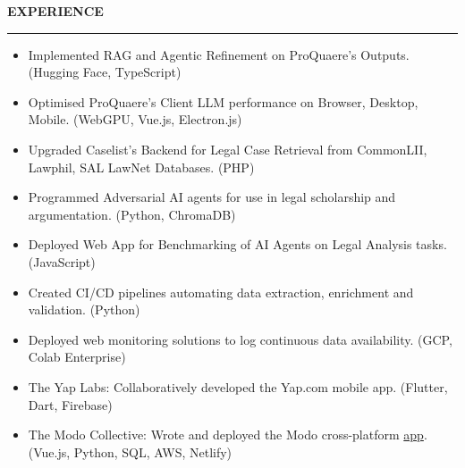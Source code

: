 \documentclass[11pt, letterpaper]{article}
\newcommand\sectionTitle[1]{%
    \begingroup
        \textbf{\MakeUppercase{#1}}
        \vspace{0.4em}
        \hrule
        \vspace{-0.3em}
    \endgroup
}%
\newenvironment{experienceSection}[1]{%
    \sectionTitle{#1}%
    \begin{list}{}{ %
        \setlength{\leftmargin}{0em} %
    }%
        \item[]%
    }{%
    \end{list}%
}%
\begin{document}
\begin{experienceSection}{Experience}

    \experienceItem[
        company={Custom Automated Systems},
        location={Singapore},
        position={Full Stack Development Intern},
        duration={May 2025 - Aug. 2025}
    ]
    \begin{itemize}
        \setlength{\itemsep}{-6pt}
        \item Implemented RAG and Agentic Refinement on ProQuaere's Outputs. (Hugging Face, TypeScript)
        \item Optimised ProQuaere's Client LLM performance on Browser, Desktop, Mobile. (WebGPU, Vue.js, Electron.js)
        \item Upgraded Caselist's Backend for Legal Case Retrieval from CommonLII, Lawphil, SAL LawNet Databases. (PHP)
    \end{itemize}

    \experienceItem[
        company={SMU Yong Pung How School of Law},
        location={Singapore},
        position={Research Assistant},
        duration={Jan. 2025 - Aug. 2025}
    ]
    \begin{itemize}
        \setlength{\itemsep}{-6pt}
        \item Programmed Adversarial AI agents for use in legal scholarship and argumentation. (Python, ChromaDB)
        \item Deployed Web App for Benchmarking of AI Agents on Legal Analysis tasks. (JavaScript)
    \end{itemize}

    \experienceItem[
        company={Elefant},
        location={Singapore},
        position={Backend Development Intern},
        duration={Sep. 2024 - Dec. 2024}
    ]
    \begin{itemize}
        \setlength{\itemsep}{-6pt}
        \item Created CI/CD pipelines automating data extraction, enrichment and validation. (Python)
        \item Deployed web monitoring solutions to log continuous data availability. (GCP, Colab Enterprise)
    \end{itemize}

    \experienceItem[
        company={Various Startups},
        location={Singapore},
        position={Founder, Co-founder, Tech Development Head},
        duration={Apr. 2024 - Mar. 2025}
    ]
    \begin{itemize}
        \setlength{\itemsep}{-6pt}
        \item The Yap Labs: Collaboratively developed the Yap.com mobile app. (Flutter, Dart, Firebase)\
        \item The Modo Collective: Wrote and deployed the Modo cross-platform \href{https://modo-live.netlify.app/}{app}. (Vue.js, Python, SQL, AWS, Netlify)
    \end{itemize}


\end{experienceSection}
\end{document}
